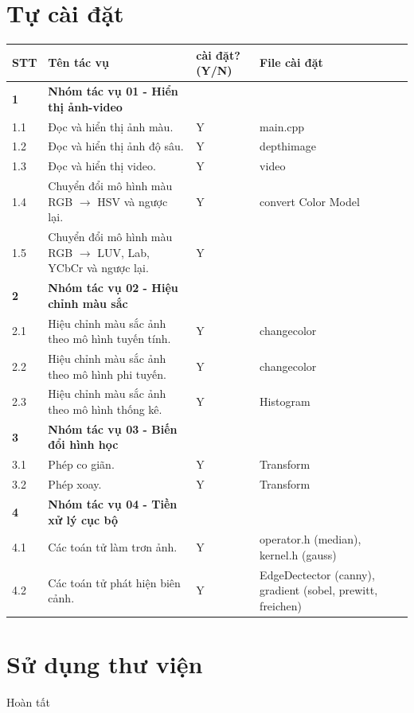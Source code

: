 \documentclass{article}
\begin{document}
\section{Tự cài đặt}
\begin{table}[H]
\begin{tabular}{l | l | l| p{3cm} }
	\hline
	\textbf{STT} & \textbf{Tên tác vụ} & \textbf{cài đặt? (Y/N)} & \textbf{File cài đặt} \\
	\hline
	\textbf{1} & \textbf{Nhóm tác vụ 01 - Hiển thị ảnh-video} & \\  \hline 
	1.1 & Đọc và hiển thị ảnh màu. &  Y & main.cpp \\ \hline 
	1.2 & Đọc và hiển thị ảnh độ sâu. & Y & depthimage\\ \hline 
	1.3 & Đọc và hiển thị video. & Y & video\\ \hline 
	1.4 & Chuyển đổi mô hình màu RGB $\to$ HSV và ngược lại. & Y & convert Color Model \\  \hline
	1.5 & Chuyển đổi mô hình màu RGB $\to$ LUV, Lab, YCbCr và ngược lại. & Y \\ \hline 
	\textbf{2} & \textbf{Nhóm tác vụ 02 - Hiệu chỉnh màu sắc} &\\ \hline 
	2.1 & Hiệu chỉnh màu sắc ảnh theo mô hình tuyến tính. & Y &  changecolor \\ \hline 
	2.2 & Hiệu chỉnh màu sắc ảnh theo mô hình phi tuyến. & Y & changecolor\\ \hline 
	2.3 & Hiệu chỉnh màu sắc ảnh theo mô hình thống kê. & Y & Histogram\\ \hline
	\textbf{3} & \textbf{Nhóm tác vụ 03 - Biến đổi hình học} & & \\ \hline 
	3.1 & Phép co giãn. & Y & Transform\\ \hline 
	3.2 & Phép xoay. & Y & Transform\\ \hline 
	\textbf{4} & \textbf{Nhóm tác vụ 04 - Tiền xử lý cục bộ} &\\ \hline 
	4.1 & Các toán tử làm trơn ảnh. &  Y & operator.h (median), kernel.h (gauss)  \\ \hline

	4.2 & Các toán tử phát hiện biên cảnh. & Y & EdgeDectector (canny), gradient (sobel, prewitt, freichen)\\ \hline
\end{tabular}
\end{table}

\section{Sử dụng thư viện}
	Hoàn tất
\end{document}
